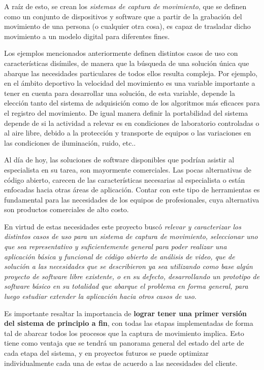 A raíz de esto, se crean los \emph{sistemas de captura de movimiento}, que se definen como un conjunto de dispositivos y software que a partir de la grabación del movimiento de una persona (o cualquier otra cosa), es capaz de trasladar dicho movimiento a un modelo digital para diferentes fines.

Los ejemplos mencionados anteriormente definen distintos casos de uso con características disímiles, de manera que la búsqueda de una solución única que abarque las necesidades particulares de todos ellos resulta compleja. Por ejemplo, en el ámbito deportivo la velocidad del movimiento es una variable importante a tener en cuenta para desarrollar una solución, de esta variable, depende la elección tanto del sistema de adquisición como de los algoritmos más eficaces para el registro del movimiento.  De igual manera definir la portabilidad del sistema depende de si la actividad a relevar es en condiciones de laboratorio controladas o al aire libre, debido a la protección y transporte de equipos o las variaciones en las condiciones de iluminación, ruido, etc..

Al  día  de  hoy,  las  soluciones  de  software  disponibles que  podrían  asistir al especialista en su tarea, son mayormente comerciales. Las pocas alternativas de código abierto, carecen de las características necesarias al especialista o están enfocadas hacia otras áreas de aplicación. Contar con este tipo de herramientas es fundamental para las necesidades de los equipos de profesionales, cuya alternativa son productos comerciales de alto costo.

En virtud de estas necesidades este proyecto buscó \emph{relevar y caracterizar los distintos casos de uso para un sistema de captura de movimiento,  seleccionar uno que sea representativo y suficientemente general para poder realizar una aplicación básica y funcional de código abierto de análisis de video, que de solución a las necesidades que se describieron ya sea utilizando como base algún  proyecto  de  software  libre  existente,  o en su defecto, desarrollando un prototipo de software básico en su totalidad que abarque el problema en forma general, para luego estudiar extender la aplicación hacia otros casos de uso}.

Es importante resaltar la importancia de \textbf{lograr tener una primer versión del sistema de principio a fin}, con todas las etapas implementadas de forma tal de abarcar todos los procesos que la captura de movimiento implica.  Esto tiene como ventaja que se tendrá un panorama general del estado del arte de cada etapa del sistema, y en proyectos futuros se puede optimizar individualmente cada una de estas de acuerdo a las necesidades del cliente.


